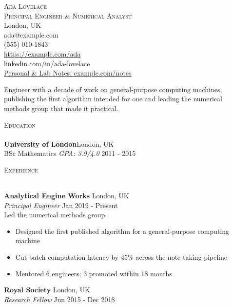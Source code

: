 \documentclass[a4paper]{article}
\newcommand{\lineunder} {
    \vspace*{-8pt} \\
    \hspace*{-18pt} \hrulefill \\
}
\newcommand{\header} [1] {
    {\hspace*{-18pt}\vspace*{3pt} \textsc{#1}}
    \vspace*{-3pt} \lineunder
}
\begin{document}
    \vspace*{-40pt}

      \vspace*{-10pt}
      \begin{center}
        {\Huge \scshape {Ada Lovelace}}\\
  {\large \scshape Principal Engineer \& Numerical Analyst}\\
  London, UK \\
ada@example.com \\
(555) 010-1843 \\
\href{https://example.com/ada}{https://example.\allowbreak{}com/\allowbreak{}ada} \\
\href{https://linkedin.com/in/ada-lovelace}{linkedin.\allowbreak{}com/\allowbreak{}in/\allowbreak{}ada-\allowbreak{}lovelace} \\
\href{https://example.com/notes}{Personal \& Lab Notes: example.\allowbreak{}com/\allowbreak{}notes}\\
      \end{center}
      \vspace{-2mm}
Engineer with a decade of work on general-purpose computing machines, publishing the first algorithm intended for one and leading the numerical methods group that made it practical.
\vspace{2mm}

      \header{Education}
      \textbf{University of London}\hfill London, UK\\
BSc Mathematics \textit{GPA: 3.9/4.0} \hfill 2011 - 2015\\
\vspace{2mm}

      \header{Experience}
      \vspace{1mm}

      \textbf{Analytical Engine Works} \hfill London, UK\\
          \textit{Principal Engineer} \hfill Jan 2019 - Present\\
          Led the numerical methods group.\\
          \vspace{-1mm}
\begin{itemize} \itemsep 2pt
  \item Designed the first published algorithm for a general-purpose computing machine
  \item Cut batch computation latency by 45\% across the note-taking pipeline
  \item Mentored 6 engineers; 3 promoted within 18 months
\end{itemize}
      \textbf{Royal Society} \hfill London, UK\\
          \textit{Research Fellow} \hfill Jun 2015 - Dec 2018\\
          
\end{document}
